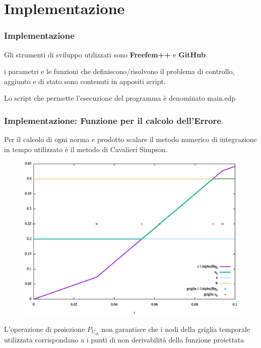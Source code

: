 \documentclass{beamer}
\theoremstyle{definition}
\theoremstyle{remark}
\theoremstyle{plain}
\theoremstyle{definition}
\begin{document}
\section{Implementazione}
\begin{frame}
\frametitle{Implementazione}
Gli strumenti di sviluppo utilizzati sono \textbf{Freefem++} e \textbf{GitHub}.
\par\bigskip
i parametri e le funzioni che definiscono/risolvono il problema di controllo, aggiunto e di stato sono contenuti in appositi script.
\par\bigskip
Lo script che permette l'esecuzione del programma è denominato main.edp

\end{frame}
\frametitle{Implementazione: Funzione per il calcolo dell'Errore}
\begin{frame}

Per il calcolo di ogni norma e prodotto scalare il metodo numerico di integrazione in tempo utilizzato è il metodo di Cavalieri Simpson.

\begin{figure}
\centering
\includegraphics[scale=0.25]{img/cap5/griglie}
\label{fig:griglie}
\end{figure}

L'operazione di proiezione $P_{U_{ab}}$ non garantisce che i nodi della griglia temporale utilizzata corrispondano a i punti di non derivabilità della funzione proiettata

\end{frame}
\end{document}
